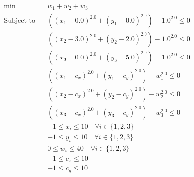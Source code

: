     $$ \begin{array}{lr}
    \min\quad & w_{1} + w_{2} + w_{3}\\
\text{Subject to} \quad & ((x_{1} - 0.0) ^ 2.0 + (y_{1} - 0.0) ^ 2.0) - 1.0 ^ 2.0 \leq 0\\
 & ((x_{2} - 3.0) ^ 2.0 + (y_{2} - 2.0) ^ 2.0) - 1.0 ^ 2.0 \leq 0\\
 & ((x_{3} - 0.0) ^ 2.0 + (y_{3} - 5.0) ^ 2.0) - 1.0 ^ 2.0 \leq 0\\
 & ((x_{1} - c_x) ^ 2.0 + (y_{1} - c_y) ^ 2.0) - w_{1} ^ 2.0 \leq 0\\
 & ((x_{2} - c_x) ^ 2.0 + (y_{2} - c_y) ^ 2.0) - w_{2} ^ 2.0 \leq 0\\
 & ((x_{3} - c_x) ^ 2.0 + (y_{3} - c_y) ^ 2.0) - w_{3} ^ 2.0 \leq 0\\
 & -1 \leq x_{i} \leq 10 \quad\forall i \in \{1,2,3\}\\
 & -1 \leq y_{i} \leq 10 \quad\forall i \in \{1,2,3\}\\
 & 0 \leq w_{i} \leq 40 \quad\forall i \in \{1,2,3\}\\
 & -1 \leq c_x \leq 10\\
 & -1 \leq c_y \leq 10\\
\end{array}
 $$

